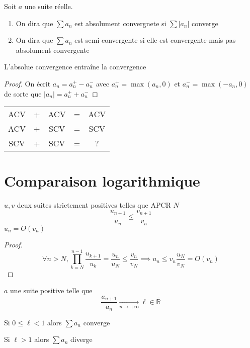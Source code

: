 \begin{dfn}
    Soit $a$ une suite réelle. \begin{enumerate}
        \item On dira que $\sum a_n$ est absolument convergnete si $\sum |a_n|$ converge
        \item On dira que $\sum a_n$ est semi convergente si elle est convergente mais pas absolument convergente
    \end{enumerate}
\end{dfn}

\begin{thm}
    L'absolue convergence entraîne la convergence
\end{thm}

\begin{proof}
    On écrit $a_n=a_n^+-a_n^-$ avec $a_n^+=\max(a_n, 0)$ et $a_n^-=\max(-a_n, 0)$ de sorte que $|a_n|=a_n^++a_n^-$
\end{proof}

\begin{rem}
    \begin{center}
    \begin{tabular}{ccccc}
        ACV & + & ACV & = & ACV\\
        ACV & + & SCV & = & SCV\\
        SCV & + & SCV & = & ?
    \end{tabular}
    \end{center}
\end{rem}

\section{Comparaison logarithmique}

\begin{prop}
    \Hyp $u, v$ deux suites strictement positives telles que APCR $N$ \[
    \frac{u_{n+1}}{u_n}\leq \frac{v_{n+1}}{v_n}
    \]
    \Conc $u_n=O(v_n)$
\end{prop}

\begin{proof}
    \[
        \forall n>N, \prod_{k=N}^{n-1}\frac{u_{k+1}}{u_k}=\frac{u_n}{u_N}\leq \frac{v_n}{v_N}\implies u_n\leq v_n\frac{u_N}{v_N}=O(v_n)
    \]
\end{proof}

\begin{thm}
    \Hyp $a$ une suite positive telle que \[
        \frac{a_{n+1}}{a_n}\xrightarrow[n\to+\infty]{}\ell\in\bar{\mathbb R}
    \]
    \begin{concenum}
    \item Si $0\leq \ell <1$ alors $\sum a_n$ converge
    \item Si $\ell>1$ alors $\sum a_n$ diverge
    \end{concenum}
\end{thm}


